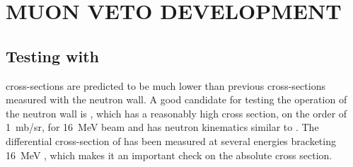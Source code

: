 %
%
%
%
%
%
%
%

%
%

\chapter{MUON VETO DEVELOPMENT}
\label{chap:muVeto}

\section{Testing with \MgReaction}

\reaction cross-sections are predicted to be much lower than previous cross-sections measured with the neutron wall.  A good candidate for testing the operation of the neutron wall is \MgReaction, which has a reasonably high cross section, on the order of 1~mb/sr, for 16~MeV  beam and has neutron kinematics similar to \reaction.  The differential cross-section of \MgReaction has been measured at several energies bracketing 16~MeV \citep{Bohne_Mg, MgCrossSection1}, which makes it an important check on the \reaction absolute cross section.  

